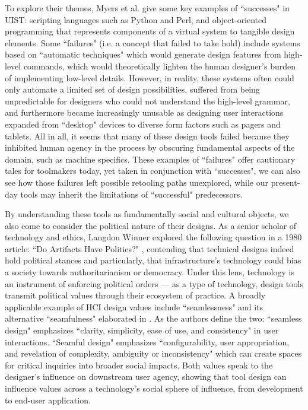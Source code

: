 To explore their themes, Myers et al. give some key examples of ``successes" in UIST: scripting languages such as Python and Perl, and object-oriented programming that represents components of a virtual system to tangible design elements. Some ``failures" (i.e. a concept that failed to take hold) include systems based on ``automatic techniques" which would generate design features from high-level commands, which would theoretically lighten the human designer's burden of implementing low-level details. However, in reality, these systems often could only automate a limited set of design possibilities, suffered from being unpredictable for designers who could not understand the high-level grammar, and furthermore became increasingly unusable as designing user interactions expanded from ``desktop" devices to diverse form factors such as pagers and tablets. All in all, it seems that many of these design tools failed because they inhibited human agency in the process by obscuring fundamental aspects of the domain, such as machine specifics. These examples of ``failures" offer cautionary tales for toolmakers today, yet taken in conjunction with ``successes", we can also see how those failures left possible retooling paths unexplored, while our present-day tools may inherit the limitations of ``successful" predecessors.

By understanding these tools as fundamentally social and cultural objects, we also come to consider the political nature of their designs. As a senior scholar of technology and ethics, Langdon Winner explored the following question in a 1980 article: ``Do Artifacts Have Politics?" \cite{winner_artifacts_1980}, contending that technical designs indeed hold political stances and particularly, that infrastructure's technology could bias a society towards authoritarianism or democracy. Under this lens, technology is an instrument of enforcing political orders --- as a type of technology, design tools transmit political values through their ecosystem of practice. A broadly applicable example of HCI design values include ``seamlessness" and its alternative ``seamfulness" elaborated in \todo{[62]}. As the authors define the two: ``seamless design" emphasizes ``clarity, simplicity, ease of use, and consistency" in user interactions. ``Seamful design" emphasizes ``configurability, user appropriation, and revelation of complexity, ambiguity or inconsistency" which can create spaces for critical inquiries into broader social impacts. Both values speak to the designer's influence on downstream user agency, showing that tool design can influence values across a technology's social sphere of influence, from development to end-user application. 

